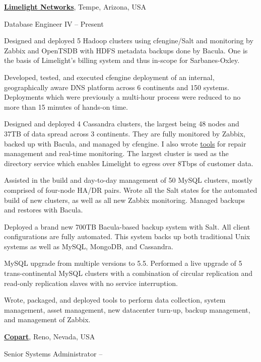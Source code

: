 \documentclass[letterpaper,10pt,oneside]{article}
\begin{document}
\begin{body}
\href{http://www.limelight.com/}
{\textbf{Limelight Networks}},
Tempe, Arizona, USA
\par
Database Engineer IV
\hfill
{} -- Present

\begin{detail}

\BulletItem
Designed and deployed 5 Hadoop clusters using cfengine/Salt and
monitoring by Zabbix and OpenTSDB with HDFS metadata backups done by
Bacula.  One is the basis of Limelight's billing system and thus in-scope
for Sarbanes-Oxley.

\BulletItem
Developed, tested, and executed cfengine deployment of an internal,
geographically aware DNS platform across 6 continents and 150 systems.
Deployments which were previously a multi-hour process were reduced to no
more than 15 minutes of hands-on time.

\BulletItem
Designed and deployed 4 Cassandra clusters, the largest being 48 nodes and
37TB of data spread across 3 continents.  They are fully monitored by
Zabbix, backed up with Bacula, and managed by cfengine.  I also wrote
\href{https://github.com/BrianGallew/cassandra\_tools}{tools} for repair
management and real-time monitoring.  The largest cluster is used as the
directory service which enables Limelight to egress over 8Tbps of customer
data.

\BulletItem
Assisted in the build and day-to-day management of 50 MySQL clusters,
mostly comprised of four-node HA/DR pairs.  Wrote all the Salt states for
the automated build of new clusters, as well as all new Zabbix monitoring.
Managed backups and restores with Bacula.

\BulletItem
Deployed a brand new 700TB Bacula-based backup system with Salt.  All
client configurations are fully automated.  This system backs up both
traditional Unix systems as well as MySQL, MongoDB, and Cassandra.


\BulletItem
MySQL upgrade from multiple versions to 5.5.  Performed a live upgrade of 5
trans-continental MySQL clusters with a combination of circular replication
and read-only replication slaves with no service interruption.

\BulletItem
Wrote, packaged, and deployed tools to perform data collection, system
management, asset management, new datacenter turn-up, backup management,
and management of Zabbix.

\end{detail}
\EntryGap

\href{http://www.copart.com/}
{\textbf{Copart}},
Reno, Nevada, USA
\par
Senior Systems Administrator
\hfill
{} -- 


\end{body}
\end{document}
